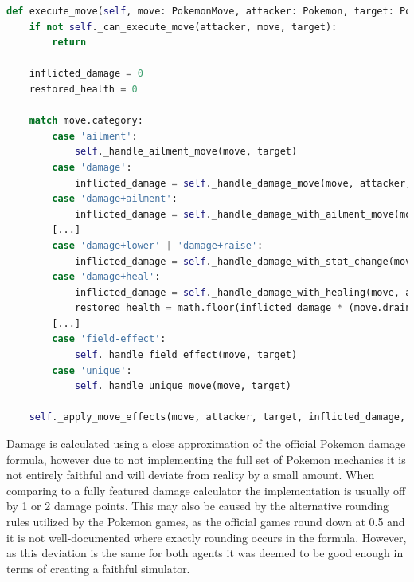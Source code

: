 \begin{lstlisting}[basicstyle=\fontsize{10}{10}\selectfont\ttfamily,language=Python,caption={Excerpt of the execute move function.},float=h,label=lst:exec-move-func,breaklines]
def execute_move(self, move: PokemonMove, attacker: Pokemon, target: Pokemon):
    if not self._can_execute_move(attacker, move, target):
        return

    inflicted_damage = 0
    restored_health = 0

    match move.category:
        case 'ailment':
            self._handle_ailment_move(move, target)
        case 'damage':
            inflicted_damage = self._handle_damage_move(move, attacker, target)
        case 'damage+ailment':
            inflicted_damage = self._handle_damage_with_ailment_move(move, attacker, target)
        [...]
        case 'damage+lower' | 'damage+raise':
            inflicted_damage = self._handle_damage_with_stat_change(move, attacker, target)
        case 'damage+heal':
            inflicted_damage = self._handle_damage_with_healing(move, attacker, target)
            restored_health = math.floor(inflicted_damage * (move.drain / 100))
        [...]
        case 'field-effect':
            self._handle_field_effect(move, target)
        case 'unique':
            self._handle_unique_move(move, target)

    self._apply_move_effects(move, attacker, target, inflicted_damage, restored_health)
\end{lstlisting}

Damage is calculated using a close approximation of the official Pokemon damage formula, however due to not implementing
the full set of Pokemon mechanics it is not entirely faithful and will deviate from reality by a small amount. When comparing
to a fully featured damage calculator the implementation is usually off by 1 or 2 damage points. This may also be caused
by the alternative rounding rules utilized by the Pokemon games, as the official games round down at 0.5 and it is not well-documented
where exactly rounding occurs in the formula. However, as this deviation is the same for both agents it was deemed to be
good enough in terms of creating a faithful simulator.
